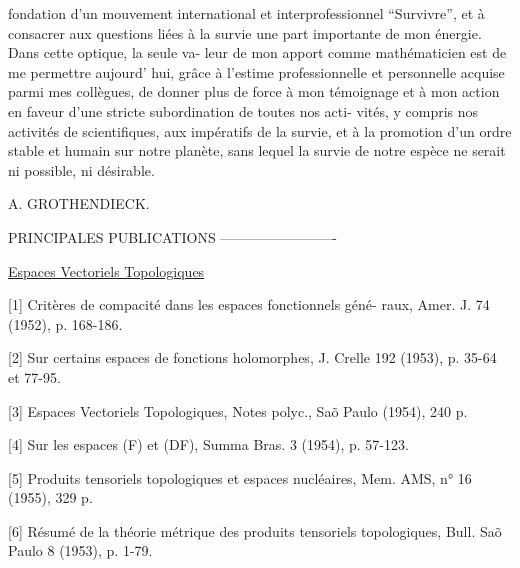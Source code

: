 
fondation d'un mouvement international et interprofessionnel
``Survivre'', et à consacrer aux questions liées à la survie une
\margin{\hand{(}}part importante de mon énergie. Dans cette optique, la seule va-%
leur de mon apport comme mathématicien est de me permettre aujourd'%
hui, grâce à l'estime professionnelle et personnelle acquise parmi
mes collègues, de donner plus de force à mon témoignage et à mon
action en faveur d'une stricte subordination de toutes nos acti-%
vités, y compris nos activités de scientifiques, aux impératifs
\margin{\hand{(}}\margin{\hand{$\vert$}}de la survie, et à la promotion d'un ordre stable et humain sur
notre planète, sans lequel la survie de notre espèce ne serait
ni possible, ni désirable.

A. GROTHENDIECK.

PRINCIPALES PUBLICATIONS
-------------------------

\uline{Espaces Vectoriels Topologiques}

[1] Critères de compacité dans les espaces fonctionnels géné-%
raux, Amer. J. 74 (1952), p. 168-186.

[2] Sur certains espaces de fonctions holomorphes, J. Crelle
192 (1953), p. 35-64 et 77-95.

[3] Espaces Vectoriels Topologiques, Notes polyc., Sa\~o Paulo
(1954), 240 p.

[4] Sur les espaces (F) et (DF), Summa Bras. 3 (1954),
p. 57-123.

[5] Produits tensoriels topologiques et espaces nucléaires,
Mem. AMS, n° 16 (1955), 329 p.

[6] Résumé de la théorie métrique des produits tensoriels
topologiques, Bull. Sa\~o Paulo 8 (1953), p. 1-79.

